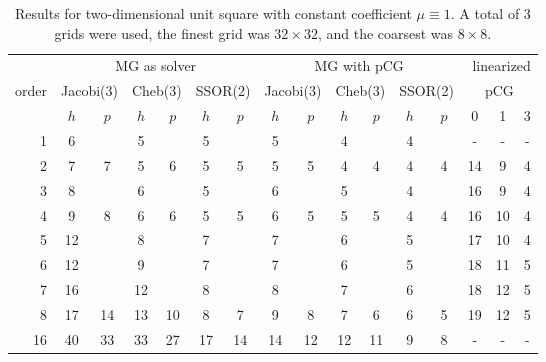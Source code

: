 \documentclass[smallcondensed,final]{svjour3}     %
\begin{document}
\begin{table}
  \caption{\label{tab:box} Results for two-dimensional unit square
    with constant coefficient $\mu\equiv 1$.  A total of 3 grids were
    used, the finest grid was $32\times 32$, and the coarsest was
    $8\times 8$.}
  \centering
  \begin{tabular}{|r|c c|c c|c c||c c|c c|c c||c c c|} 
    \hline
    & \multicolumn{6}{c||}{MG as solver} & \multicolumn{6}{c||}{MG with pCG} & \multicolumn{3}{r|}{linearized} \\
    \cline{2-13}
    \!\!\! order \!\!\!\! &  \multicolumn{2}{c|}{\!\scriptsize  Jacobi(3)\!} &  \multicolumn{2}{c|}{\!\scriptsize Cheb(3)\!} & \multicolumn{2}{c||}{\!\scriptsize  SSOR(2)\!} & \multicolumn{2}{c|}{\!\scriptsize Jacobi(3)\!} &  \multicolumn{2}{c|}{\!\scriptsize Cheb(3)\!} & \multicolumn{2}{c||}{\!\scriptsize SSOR(2)\!} & \multicolumn{3}{c|}{pCG}\\
\hline
 & $h$ & $p$ & $h$ & $p$& $h$ & $p$& $h$ & $p$& $h$ & $p$& $h$ & $p$& 0 & 1 & 3\\
 \cline{2-15}
1 & 6 & & 5 & & 5 & & 5 & & 4 & & 4 & & - & - & - \\
2 & 7 & 7 & 5 & 6 & 5 & 5 & 5 & 5 & 4 & 4 & 4 & 4 & 14 & 9 & 4 \\
3 & 8 & & 6 & & 5 & & 6 & & 5 & & 4 & & 16 & 9 & 4 \\
4 & 9 & 8 & 6 & 6 & 5 & 5 & 6 & 5 & 5 & 5 & 4 & 4 & 16 & 10 & 4 \\
5 & 12 & & 8 & & 7 & & 7 & & 6 & & 5 & & 17 & 10 & 4 \\
6 & 12 & & 9 & & 7 & & 7 & & 6 & & 5 & & 18 & 11 & 5\\
7 & 16 & & 12 & & 8 & & 8 & & 7 & & 6 & & 18 & 12 & 5 \\
8 & 17 & 14 & 13 & 10 & 8 & 7 & 9 & 8 & 7 & 6 & 6 & 5 & 19 & 12 & 5\\
16 & 40 & 33 & 33 & 27 & 17 & 14 & 14 & 12 & 12 & 11 & 9 & 8 & - & - & - \\
\hline
  \end{tabular}
\end{table}
\end{document}
